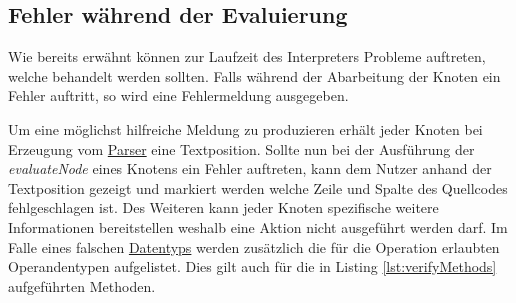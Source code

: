 \subsection{Fehler während der Evaluierung}
\label{Fehlermeldungen}
Wie bereits erwähnt können zur Laufzeit des Interpreters Probleme auftreten, welche behandelt werden sollten. 
Falls während der Abarbeitung der Knoten ein Fehler auftritt, so wird eine Fehlermeldung ausgegeben. 

Um eine möglichst hilfreiche Meldung zu produzieren erhält jeder Knoten bei Erzeugung vom \underline{Parser} eine Textposition. Sollte nun bei der Ausführung der \textit{evaluateNode} eines Knotens ein Fehler auftreten, kann dem Nutzer anhand der Textposition gezeigt und markiert werden welche Zeile und Spalte des Quellcodes fehlgeschlagen ist. Des Weiteren kann jeder Knoten spezifische weitere Informationen bereitstellen weshalb eine Aktion nicht ausgeführt werden darf. Im Falle eines falschen \underline{Datentyps} werden zusätzlich die für die Operation erlaubten Operandentypen aufgelistet. Dies gilt auch für die in Listing \ref{lst:verifyMethods} aufgeführten Methoden.
